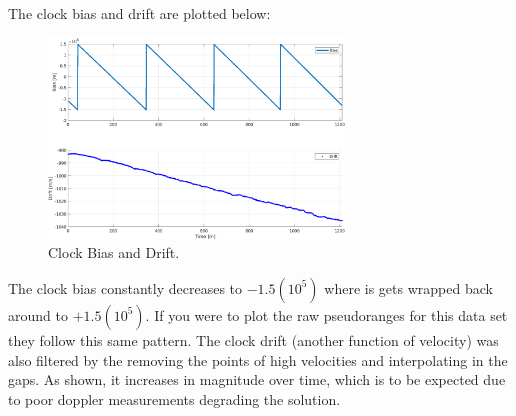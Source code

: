 \documentclass[11pt]{article}
\begin{document}
\begin{enumerate}[label=\textbf{\arabic*.}]
  The clock bias and drift are plotted below:
  \begin{figure}[H]
    \centering
    \includegraphics[width=0.7\textwidth]{dynamic_clock.png}
    \caption{Clock Bias and Drift.}
  \end{figure}
  The clock bias constantly decreases to $-1.5(10^5)$ where is gets wrapped back 
  around to $+1.5(10^5)$. If you were to plot the raw pseudoranges for this data 
  set they follow this same pattern. The clock drift (another function of velocity) 
  was also filtered by the removing the points of high velocities and interpolating 
  in the gaps. As shown, it increases in magnitude over time, which is to be expected 
  due to poor doppler measurements degrading the solution.


\end{enumerate}
\end{document}
